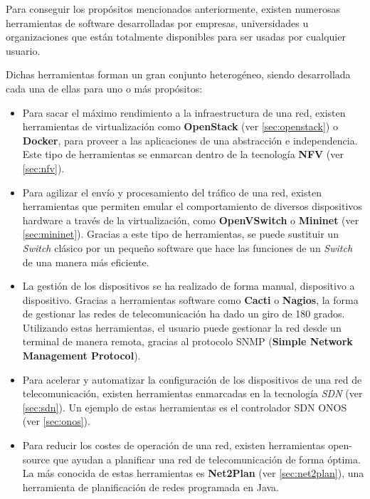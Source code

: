Para conseguir los propósitos mencionados anteriormente, existen numerosas herramientas de software desarrolladas por empresas, universidades u organizaciones que están totalmente disponibles para ser usadas por cualquier usuario.

Dichas herramientas forman un gran conjunto heterogéneo, siendo desarrollada cada una de ellas para uno o más propósitos:

\begin{itemize}
	\item Para sacar el máximo rendimiento a la infraestructura de una red, existen herramientas de virtualización como \textbf{OpenStack} (ver \ref{sec:openstack}) o \textbf{Docker}, para proveer a las aplicaciones de una abstracción e independencia. Este tipo de herramientas se enmarcan dentro de la tecnología \textbf{NFV} (ver \ref{sec:nfv}).
	
	\item Para agilizar el envío y procesamiento del tráfico de una red, existen herramientas que permiten emular el comportamiento de diversos dispositivos hardware a través de la virtualización, como \textbf{OpenVSwitch} o \textbf{Mininet} (ver \ref{sec:mininet}). Gracias a este tipo de herramientas, se puede sustituir un \textit{Switch} clásico por un pequeño software que hace las funciones de un \textit{Switch} de una manera más eficiente.
	
	\item La gestión de los dispositivos se ha realizado de forma manual, dispositivo a dispositivo. Gracias a herramientas software como \textbf{Cacti} o \textbf{Nagios}, la forma de gestionar las redes de telecomunicación ha dado un giro de 180 grados. Utilizando estas herramientas, el usuario puede gestionar la red desde un terminal de manera remota, gracias al protocolo SNMP (\textbf{Simple Network Management Protocol}).
	
	\item Para acelerar y automatizar la configuración de los dispositivos de una red de telecomunicación, existen herramientas enmarcadas en la tecnología \textit{SDN} (ver \ref{sec:sdn}). Un ejemplo de estas herramientas es el controlador SDN ONOS (ver \ref{sec:onos}).
	
	\item Para reducir los costes de operación de una red, existen herramientas open-source que ayudan a planificar una red de telecomunicación de forma óptima. La más conocida de estas herramientas es \textbf{Net2Plan} (ver \ref{sec:net2plan}), una herramienta de planificación de redes programada en Java.
\end{itemize}



\cleardoublepage